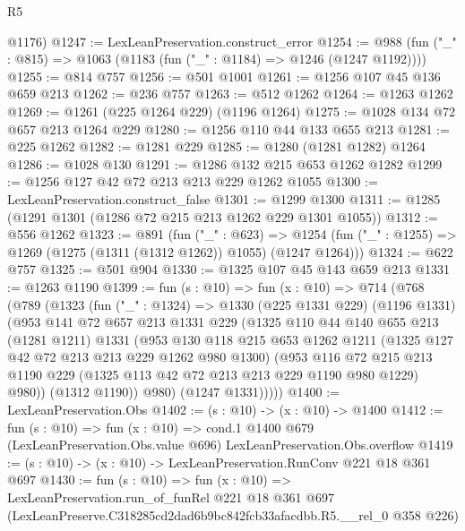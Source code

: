 \begin{lexlean}{R5}
\begin{coremodule}
      @1176)
@1247 := LexLeanPreservation.construct_error
@1254 := @988 (fun ("_" : @815) => @1063 (@1183 (fun ("_" : @1184) => @1246 (@1247 @1192))))
@1255 := @814 @757
@1256 := @501 @1001
@1261 := @1256 @107 @45 @136 @659 @213
@1262 := @236 @757
@1263 := @512 @1262
@1264 := @1263 @1262
@1269 := @1261 (@225 @1264 @229) (@1196 @1264)
@1275 := @1028 @134 @72 @657 @213 @1264 @229
@1280 := @1256 @110 @44 @133 @655 @213
@1281 := @225 @1262
@1282 := @1281 @229
@1285 := @1280 (@1281 @1282) @1264
@1286 := @1028 @130
@1291 := @1286 @132 @215 @653 @1262 @1282
@1299 := @1256 @127 @42 @72 @213 @213 @229 @1262 @1055
@1300 := LexLeanPreservation.construct_false
@1301 := @1299 @1300
@1311 := @1285 (@1291 @1301 (@1286 @72 @215 @213 @1262 @229 @1301 @1055))
@1312 := @556 @1262
@1323 := @891
    (fun ("_" : @623) =>
    @1254 (fun ("_" : @1255) => @1269 (@1275 (@1311 (@1312 @1262)) @1055) (@1247 @1264)))
@1324 := @622 @757
@1325 := @501 @904
@1330 := @1325 @107 @45 @143 @659 @213
@1331 := @1263 @1190
@1399 := fun (s : @10) =>
  fun (x : @10) =>
  @714
    (@768
      (@789
        (@1323
          (fun ("_" : @1324) =>
          @1330
            (@225 @1331 @229)
            (@1196 @1331)
            (@953
              @141
              @72
              @657
              @213
              @1331
              @229
              (@1325
                @110
                @44
                @140
                @655
                @213
                (@1281 @1211)
                @1331
                (@953
                  @130
                  @118
                  @215
                  @653
                  @1262
                  @1211
                  (@1325 @127 @42 @72 @213 @213 @229 @1262 @980 @1300)
                  (@953
                    @116
                    @72
                    @215
                    @213
                    @1190
                    @229
                    (@1325 @113 @42 @72 @213 @213 @229 @1190 @980 @1229)
                    @980))
                (@1312 @1190))
              @980)
            (@1247 @1331)))))
@1400 := LexLeanPreservation.Obs
@1402 := (s : @10) -> (x : @10) -> @1400
@1412 := fun (s : @10) =>
  fun (x : @10) =>
  cond.{1} @1400 @679 (LexLeanPreservation.Obs.value @696) LexLeanPreservation.Obs.overflow
@1419 := (s : @10) -> (x : @10) -> LexLeanPreservation.RunConv @221 @18 @361 @697
@1430 := fun (s : @10) =>
  fun (x : @10) =>
  LexLeanPreservation.run_of_funRel
    @221
    @18
    @361
    @697
    (LexLeanPreserve.C318285cd2dad6b9bc842fcb33afacdbb.R5.__rel_0 @358 @226)
\end{coremodule}
\end{lexlean}
